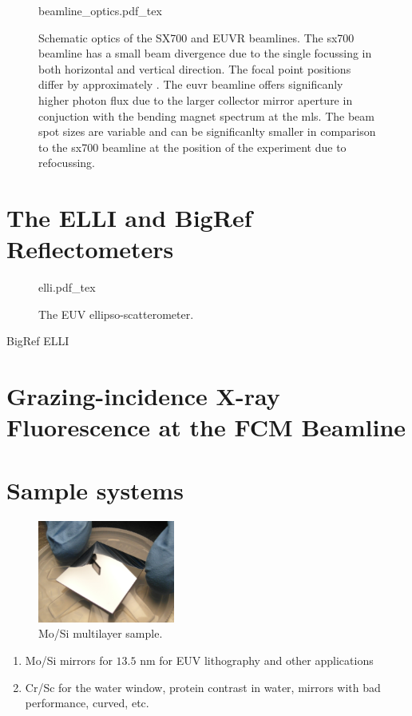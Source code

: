 \begin{figure}[htb]
    \def\svgwidth{\textwidth}
    {beamline_optics.pdf_tex}
    \caption[Schematic optics of the SX700 and EUVR beamlines.]{Schematic optics of the SX700 and EUVR beamlines. The \gls{sx700} beamline has a small beam divergence due to the single focussing in both horizontal and vertical direction. The focal point positions differ by approximately . The \gls{euvr} beamline offers significanly higher photon flux due to the larger collector mirror aperture in conjuction with the bending magnet spectrum at the \gls{mls}. The beam spot sizes are variable and can be significanlty smaller in comparison to the \gls{sx700} beamline at the position of the experiment due to refocussing.}
    \label{ch_exp:beamline_optics}
\end{figure}

\section{The ELLI and BigRef Reflectometers}
\begin{figure}[htb]
    \def\svgwidth{\textwidth}
    {elli.pdf_tex}
    \caption[The EUV ellipso-scatterometer.]{The EUV ellipso-scatterometer.}
    \label{ch_exp:fig_elli}
\end{figure}
BigRef \cite{scholze_high-accuracy_2001}
ELLI \cite{soltwisch_polarization_2015}
\section{Grazing-incidence X-ray Fluorescence at the FCM Beamline}

\section{Sample systems}
\begin{figure}[htb]
        \includegraphics[width=0.4\textwidth]{img/SAM_1910_v1}
        \caption[Mo/Si multilayer sample.]{%
            Mo/Si multilayer sample.}
        \label{ch_exp:fig_mosi_sample}
\end{figure}
\begin{enumerate}
 \item Mo/Si mirrors for $13.5$ nm for EUV lithography and other applications
 \item Cr/Sc for the water window, protein contrast in water, mirrors with bad performance, curved, etc.
\end{enumerate}
